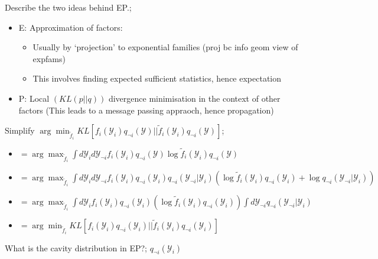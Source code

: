 \documentclass{article}
\begin{document}
Describe the two ideas behind EP.; \begin{itemize}
    \item E: Approximation of factors: \begin{itemize}
        \item Usually by `projection' to exponential families (proj bc info geom view of expfams)
        \item This involves finding expected sufficient statistics, hence expectation
    \end{itemize}
    \item P: Local $(KL(p||q))$ divergence minimisation in the context of other factors (This leads to a message passing appraoch, hence propagation)
\end{itemize}

Simplify $\arg\min_{\tilde{f}_i}KL[f_i(\mathcal{Y}_i)q_{\neg i}(\mathcal{Y})||\tilde{f}_i(\mathcal{Y}_i)q_{\neg i}(\mathcal{Y})]$; \begin{itemize}
    \item $=\arg\max_{\tilde{f}_i} \int d\mathcal{Y}_i d\mathcal{Y}_{\neg i} f_i(\mathcal{Y}_i)q_{\neg i}(\mathcal{Y})\log \tilde{f}_i(\mathcal{Y}_i) q_{\neg i}(\mathcal{Y})$
    \item $=\arg\max_{\tilde{f}_i} \int d\mathcal{Y}_i d\mathcal{Y}_{\neg i} f_i(\mathcal{Y}_i)q_{\neg i}(\mathcal{Y}_i)q_{\neg i}(\mathcal{Y}_{\neg i}|\mathcal{Y}_i)(\log \tilde{f}_i(\mathcal{Y}_i)q_{\neg i}(\mathcal{Y}_i)+\log q_{\neg i}(\mathcal{Y}_{\neg i}|\mathcal{Y}_i))$
    \item $=\arg\max_{\tilde{f}_i} \int d\mathcal{Y}_i f_i(\mathcal{Y}_i)q_{\neg i}(\mathcal{Y}_i)(\log \tilde{f}_i(\mathcal{Y}_i)q_{\neg i}(\mathcal{Y}_i)) \int d\mathcal{Y}_{\neg i} q_{\neg i}(\mathcal{Y}_{\neg i}|\mathcal{Y}_i)$
    \item $=\arg\min_{\tilde{f}_i}KL[f_i(\mathcal{Y}_i)q_{\neg i}(\mathcal{Y}_i)||\tilde{f}_i(\mathcal{Y}_i)q_{\neg i}(\mathcal{Y}_i)]$
\end{itemize}

What is the cavity distribution in EP?; $q_{\neg i}(\mathcal{Y}_i)$
\end{document}
